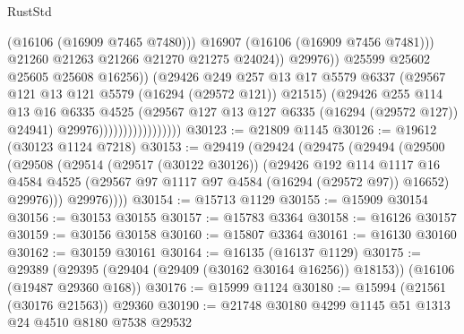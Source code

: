 \begin{lexlean}{RustStd}
\begin{coremodule}
                                                  (@16106 (@16909 @7465 @7480)))
                                                @16907
                                                (@16106 (@16909 @7456 @7481)))
                                              @21260
                                              @21263
                                              @21266
                                              @21270
                                              @21275
                                              @24024))
                                          @29976))
                                      @25599
                                      @25602
                                      @25605
                                      @25608
                                      @16256))
                                  (@29426
                                    @249
                                    @257
                                    @13
                                    @17
                                    @5579
                                    @6337
                                    (@29567 @121 @13 @121 @5579 (@16294 (@29572 @121)) @21515)
                                    (@29426
                                      @255
                                      @114
                                      @13
                                      @16
                                      @6335
                                      @4525
                                      (@29567 @127 @13 @127 @6335 (@16294 (@29572 @127)) @24941)
                                      @29976)))))))))))))))))
@30123 := @21809 @1145
@30126 := @19612 (@30123 @1124 @7218)
@30153 := @29419
    (@29424
      (@29475
        (@29494
          (@29500
            (@29508
              (@29514
                (@29517 (@30122 @30126))
                (@29426
                  @192
                  @114
                  @1117
                  @16
                  @4584
                  @4525
                  (@29567 @97 @1117 @97 @4584 (@16294 (@29572 @97)) @16652)
                  @29976)))
            @29976))))
@30154 := @15713 @1129
@30155 := @15909 @30154
@30156 := @30153 @30155
@30157 := @15783 @3364
@30158 := @16126 @30157
@30159 := @30156 @30158
@30160 := @15807 @3364
@30161 := @16130 @30160
@30162 := @30159 @30161
@30164 := @16135 (@16137 @1129)
@30175 := @29389
    (@29395 (@29404 (@29409 (@30162 @30164 @16256)) @18153))
    (@16106 (@19487 @29360 @168))
@30176 := @15999 @1124
@30180 := @15994 (@21561 (@30176 @21563)) @29360
@30190 := @21748 @30180 @4299 @1145 @51 @1313 @24 @4510 @8180 @7538 @29532

\end{coremodule}
\end{lexlean}
